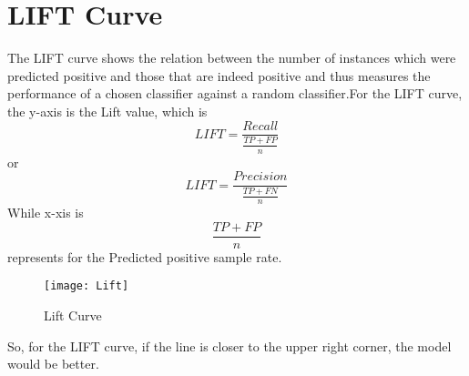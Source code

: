 \documentclass{article}
\begin{document}
\section{LIFT Curve}
The LIFT curve shows the relation between the number of instances which were predicted positive and those that are indeed positive and thus measures the performance of a chosen classifier against a random classifier.For the LIFT curve, the y-axis is the Lift value, which is 
\[ LIFT = \frac{Recall}{\frac{TP + FP}{n}}\]
or
\[LIFT = \frac{Precision}{\frac{TP + FN}{n}}\]
While x-xis is 
\[\frac{TP + FP}{n}\] represents for the Predicted positive sample rate.
\begin{figure}[htp]
    \centering
    \texttt{[image: Lift]}
    \caption{Lift Curve}
\end{figure}

So, for the LIFT curve, if the line is closer to the upper right corner, the model would be better.
\end{document}

